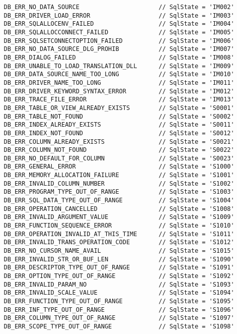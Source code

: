 \begin{verbatim}
   DB_ERR_NO_DATA_SOURCE                      // SqlState = 'IM002'
   DB_ERR_DRIVER_LOAD_ERROR                   // SqlState = 'IM003'
   DB_ERR_SQLALLOCENV_FAILED                  // SqlState = 'IM004'
   DB_ERR_SQLALLOCCONNECT_FAILED              // SqlState = 'IM005'
   DB_ERR_SQLSETCONNECTOPTION_FAILED          // SqlState = 'IM006'
   DB_ERR_NO_DATA_SOURCE_DLG_PROHIB           // SqlState = 'IM007'
   DB_ERR_DIALOG_FAILED                       // SqlState = 'IM008'
   DB_ERR_UNABLE_TO_LOAD_TRANSLATION_DLL      // SqlState = 'IM009'
   DB_ERR_DATA_SOURCE_NAME_TOO_LONG           // SqlState = 'IM010'
   DB_ERR_DRIVER_NAME_TOO_LONG                // SqlState = 'IM011'
   DB_ERR_DRIVER_KEYWORD_SYNTAX_ERROR         // SqlState = 'IM012'
   DB_ERR_TRACE_FILE_ERROR                    // SqlState = 'IM013'
   DB_ERR_TABLE_OR_VIEW_ALREADY_EXISTS        // SqlState = 'S0001'
   DB_ERR_TABLE_NOT_FOUND                     // SqlState = 'S0002'
   DB_ERR_INDEX_ALREADY_EXISTS                // SqlState = 'S0011'
   DB_ERR_INDEX_NOT_FOUND                     // SqlState = 'S0012'
   DB_ERR_COLUMN_ALREADY_EXISTS               // SqlState = 'S0021'
   DB_ERR_COLUMN_NOT_FOUND                    // SqlState = 'S0022'
   DB_ERR_NO_DEFAULT_FOR_COLUMN               // SqlState = 'S0023'
   DB_ERR_GENERAL_ERROR                       // SqlState = 'S1000'
   DB_ERR_MEMORY_ALLOCATION_FAILURE           // SqlState = 'S1001'
   DB_ERR_INVALID_COLUMN_NUMBER               // SqlState = 'S1002'
   DB_ERR_PROGRAM_TYPE_OUT_OF_RANGE           // SqlState = 'S1003'
   DB_ERR_SQL_DATA_TYPE_OUT_OF_RANGE          // SqlState = 'S1004'
   DB_ERR_OPERATION_CANCELLED                 // SqlState = 'S1008'
   DB_ERR_INVALID_ARGUMENT_VALUE              // SqlState = 'S1009'
   DB_ERR_FUNCTION_SEQUENCE_ERROR             // SqlState = 'S1010'
   DB_ERR_OPERATION_INVALID_AT_THIS_TIME      // SqlState = 'S1011'
   DB_ERR_INVALID_TRANS_OPERATION_CODE        // SqlState = 'S1012'
   DB_ERR_NO_CURSOR_NAME_AVAIL                // SqlState = 'S1015'
   DB_ERR_INVALID_STR_OR_BUF_LEN              // SqlState = 'S1090'
   DB_ERR_DESCRIPTOR_TYPE_OUT_OF_RANGE        // SqlState = 'S1091'
   DB_ERR_OPTION_TYPE_OUT_OF_RANGE            // SqlState = 'S1092'
   DB_ERR_INVALID_PARAM_NO                    // SqlState = 'S1093'
   DB_ERR_INVALID_SCALE_VALUE                 // SqlState = 'S1094'
   DB_ERR_FUNCTION_TYPE_OUT_OF_RANGE          // SqlState = 'S1095'
   DB_ERR_INF_TYPE_OUT_OF_RANGE               // SqlState = 'S1096'
   DB_ERR_COLUMN_TYPE_OUT_OF_RANGE            // SqlState = 'S1097'
   DB_ERR_SCOPE_TYPE_OUT_OF_RANGE             // SqlState = 'S1098'

\end{verbatim}
